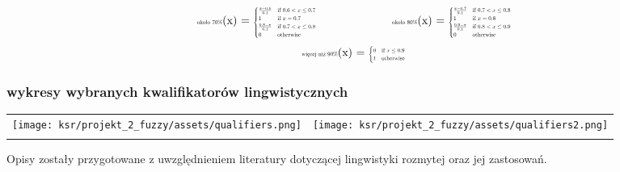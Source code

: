 \documentclass{article}
\begin{document}
\[
\begin{minipage}{0.5\textwidth}
\centering
\text{\scalebox{0.5}{około 70\%}}(x) = \scalebox{0.5}{$
\begin{cases}
\frac{x - 0.6}{0.1} & \text{if } 0.6 < x \leq 0.7 \\
1 & \text{if } x = 0.7 \\
\frac{0.8 - x}{0.1} & \text{if } 0.7 < x \leq 0.8 \\
0 & \text{otherwise}
\end{cases}
$}
\end{minipage}%
\begin{minipage}{0.5\textwidth}
\centering
\text{\scalebox{0.5}{około 80\%}}(x) = \scalebox{0.5}{$
\begin{cases}
\frac{x - 0.7}{0.1} & \text{if } 0.7 < x \leq 0.8 \\
1 & \text{if } x = 0.8 \\
\frac{0.9 - x}{0.1} & \text{if } 0.8 < x \leq 0.9 \\
0 & \text{otherwise}
\end{cases}
$}
\end{minipage}
\]
\[
\begin{minipage}{0.5\textwidth}
\centering
\text{\scalebox{0.5}{więcej niż 90\%}}(x) = \scalebox{0.5}{$
\begin{cases}
0 & \text{if } x \leq 0.9 \\
1 & \text{otherwise}
\end{cases}
$}
\end{minipage}
\]


\subsubsection{wykresy wybranych kwalifikatorów lingwistycznych}


\begin{table}[H]
\centering
\begin{tabular}{cc}
    \texttt{[image: ksr/projekt\_2\_fuzzy/assets/qualifiers.png]} &
    \texttt{[image: ksr/projekt\_2\_fuzzy/assets/qualifiers2.png]} \\
     \\
\end{tabular}
\label{fig:two_images}
\end{table}


Opisy zostały przygotowane z uwzględnieniem literatury dotyczącej lingwistyki rozmytej oraz jej zastosowań.
\end{document}
